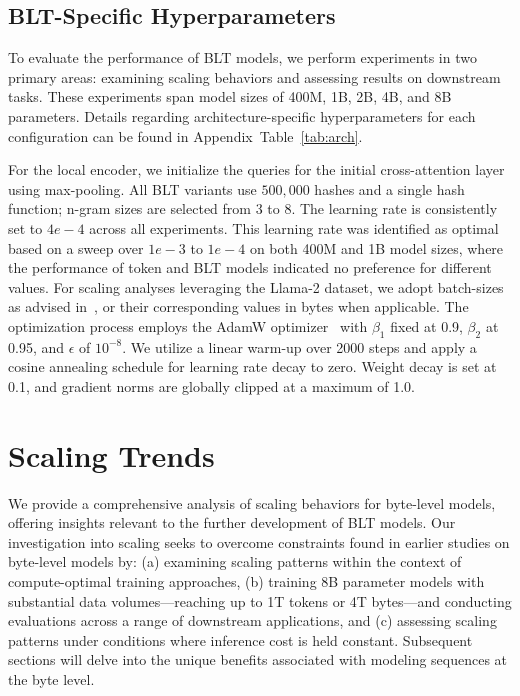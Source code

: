 \subsection{{\textsc BLT}-Specific Hyperparameters} 
To evaluate the performance of {\textsc BLT} models, we perform experiments in two primary areas: examining scaling behaviors and assessing results on downstream tasks. These experiments span model sizes of 400M, 1B, 2B, 4B, and 8B parameters. Details regarding architecture-specific hyperparameters for each configuration can be found in Appendix~Table~\ref{tab:arch}.

For the local encoder, we initialize the queries for the initial cross-attention layer using max-pooling. All {\textsc BLT} variants use $500,000$ hashes and a single hash function; n-gram sizes are selected from 3 to 8. The learning rate is consistently set to $4e-4$ across all experiments. This learning rate was identified as optimal based on a sweep over $1e-3$ to $1e-4$ on both 400M and 1B model sizes, where the performance of token and {\textsc BLT} models indicated no preference for different values. For scaling analyses leveraging the Llama-2 dataset, we adopt batch-sizes as advised in~\cite{dubey2024llama}, or their corresponding values in bytes when applicable. The optimization process employs the AdamW optimizer~\citep{adamw} with $\beta_1$ fixed at 0.9, $\beta_2$ at 0.95, and $\epsilon$ of $10^{-8}$. We utilize a linear warm-up over 2000 steps and apply a cosine annealing schedule for learning rate decay to zero. Weight decay is set at 0.1, and gradient norms are globally clipped at a maximum of 1.0.

\section{Scaling Trends}
\label{section:scaling}

We provide a comprehensive analysis of scaling behaviors for byte-level models, offering insights relevant to the further development of {\textsc BLT} models. Our investigation into scaling seeks to overcome constraints found in earlier studies on byte-level models by: (a) examining scaling patterns within the context of compute-optimal training approaches, (b) training 8B parameter models with substantial data volumes—reaching up to 1T tokens or 4T bytes—and conducting evaluations across a range of downstream applications, and (c) assessing scaling patterns under conditions where inference cost is held constant. Subsequent sections will delve into the unique benefits associated with modeling sequences at the byte level.

